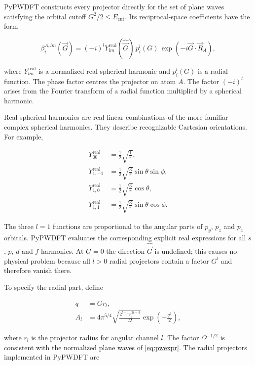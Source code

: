 PyPWDFT constructs every projector directly for the set of plane waves satisfying the orbital cutoff $G^{2}/2\leq E_{\text{cut}}$. Its reciprocal-space coefficients have the form

\begin{equation}
    \beta_{i}^{A,lm}(\vec{G}) =
    (-i)^{l}Y_{lm}^{\text{real}}(\widehat{\vec{G}})\,
    p_{i}^{l}(G)\,
    \exp\left(-i\vec{G}\cdot\vec{R}_{A}\right),
    \label{eq:gth-beta}
\end{equation}

where $Y_{lm}^{\text{real}}$ is a normalized real spherical harmonic and $p_{i}^{l}(G)$ is a radial function. The phase factor centres the projector on atom $A$. The factor $(-i)^{l}$ arises from the Fourier transform of a radial function multiplied by a spherical harmonic.

Real spherical harmonics are real linear combinations of the more familiar complex spherical harmonics. They describe recognizable Cartesian orientations. For example,

\begin{align}
    Y_{00}^{\text{real}} &= \frac{1}{2}\sqrt{\frac{1}{\pi}},\\
    Y_{1,-1}^{\text{real}} &= \frac{1}{2}\sqrt{\frac{3}{\pi}}\sin\theta\sin\phi,\\
    Y_{1,0}^{\text{real}} &= \frac{1}{2}\sqrt{\frac{3}{\pi}}\cos\theta,\\
    Y_{1,1}^{\text{real}} &= \frac{1}{2}\sqrt{\frac{3}{\pi}}\sin\theta\cos\phi.
\end{align}

The three $l=1$ functions are proportional to the angular parts of $p_{y}$, $p_{z}$ and $p_{x}$ orbitals. PyPWDFT evaluates the corresponding explicit real expressions for all $s$, $p$, $d$ and $f$ harmonics. At $G=0$ the direction $\widehat{\vec{G}}$ is undefined; this causes no physical problem because all $l>0$ radial projectors contain a factor $G^{l}$ and therefore vanish there.

To specify the radial part, define

\begin{align}
    q &= G r_{l},\\
    A_{l} &= 4\pi^{5/4}
    \sqrt{\frac{2^{l+1}r_{l}^{2l+3}}{\Omega}}
    \exp\left(-\frac{q^{2}}{2}\right),
    \label{eq:gth-projector-prefactor}
\end{align}

where $r_{l}$ is the projector radius for angular channel $l$. The factor $\Omega^{-1/2}$ is consistent with the normalized plane waves of \cref{eq:pwexpr}. The radial projectors implemented in PyPWDFT are


